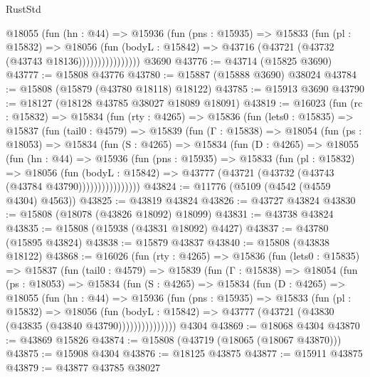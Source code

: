 \begin{lexlean}{RustStd}
\begin{coremodule}
                    @18055
                      (fun (hn : @44) =>
                      @15936
                        (fun (pns : @15935) =>
                        @15833
                          (fun (pl : @15832) =>
                          @18056
                            (fun (bodyL : @15842) =>
                            @43716 (@43721 (@43732 (@43743 @18136))))))))))))))))
    @3690
@43776 := @43714 (@15825 @3690)
@43777 := @15808 @43776
@43780 := @15887 (@15888 @3690) @38024
@43784 := @15808 (@15879 (@43780 @18118) @18122)
@43785 := @15913 @3690
@43790 := @18127 (@18128 @43785 @38027 @18089 @18091)
@43819 := @16023
    (fun (rc : @15832) =>
    @15834
      (fun (rty : @4265) =>
      @15836
        (fun (lets0 : @15835) =>
        @15837
          (fun (tail0 : @4579) =>
          @15839
            (fun (Γ : @15838) =>
            @18054
              (fun (ps : @18053) =>
              @15834
                (fun (S : @4265) =>
                @15834
                  (fun (D : @4265) =>
                  @18055
                    (fun (hn : @44) =>
                    @15936
                      (fun (pns : @15935) =>
                      @15833
                        (fun (pl : @15832) =>
                        @18056
                          (fun (bodyL : @15842) =>
                          @43777 (@43721 (@43732 (@43743 (@43784 @43790))))))))))))))))
@43824 := @11776 (@5109 (@4542 (@4559 @4304) @4563))
@43825 := @43819 @43824
@43826 := @43727 @43824
@43830 := @15808 (@18078 (@43826 @18092) @18099)
@43831 := @43738 @43824
@43835 := @15808 (@15938 (@43831 @18092) @4427)
@43837 := @43780 (@15895 @43824)
@43838 := @15879 @43837
@43840 := @15808 (@43838 @18122)
@43868 := @16026
    (fun (rty : @4265) =>
    @15836
      (fun (lets0 : @15835) =>
      @15837
        (fun (tail0 : @4579) =>
        @15839
          (fun (Γ : @15838) =>
          @18054
            (fun (ps : @18053) =>
            @15834
              (fun (S : @4265) =>
              @15834
                (fun (D : @4265) =>
                @18055
                  (fun (hn : @44) =>
                  @15936
                    (fun (pns : @15935) =>
                    @15833
                      (fun (pl : @15832) =>
                      @18056
                        (fun (bodyL : @15842) =>
                        @43777 (@43721 (@43830 (@43835 (@43840 @43790)))))))))))))))
    @4304
@43869 := @18068 @4304
@43870 := @43869 @15826
@43874 := @15808 (@43719 (@18065 (@18067 @43870)))
@43875 := @15908 @4304
@43876 := @18125 @43875
@43877 := @15911 @43875
@43879 := @43877 @43785 @38027

\end{coremodule}
\end{lexlean}

